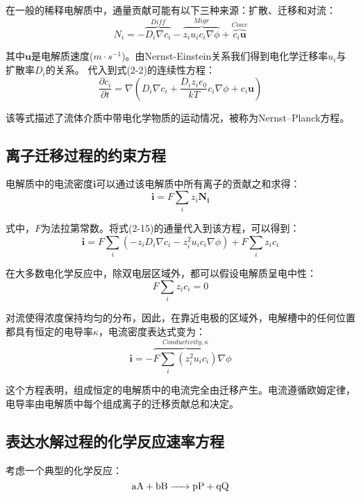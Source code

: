 在一般的稀释电解质中，通量贡献可能有以下三种来源：扩散、迁移和对流：
\begin{equation}
    N_i=-\overbrace{D_i\nabla{c_i}}^{Diff}-\overbrace{z_iu_ic_i\nabla\phi}^{Migr}+\overbrace{c_i\mathbf{u}}^{Conv}
\end{equation}

其中$\mathbf{u}$是电解质速度($m\cdot{s^{-1}}$)。由Nernst-Einstein关系我们得到电化学迁移率$u_i$与扩散率$D_i$的关系。
代入到式(2-2)的连续性方程：
\begin{equation}
    \frac{\partial c_i}{\partial t}=\nabla{(D_i\nabla{c_i}+\frac{D_iz_ie_0}{kT}c_i\nabla\phi+c_i\mathbf{u})}
    \label{equation:Nernst_Planck}
\end{equation}

该等式描述了流体介质中带电化学物质的运动情况，被称为Nernst–Planck方程\cite{Mehrer2007}。
\subsection{离子迁移过程的约束方程}
电解质中的电流密度$\mathbf{i}$可以通过该电解质中所有离子的贡献之和求得：
\begin{equation}
    \mathbf{i}=F\sum_i{z_i\mathbf{N_i}}
\end{equation}

式中，$F$为法拉第常数。将式(2-15)的通量代入到该方程，可以得到：
\begin{equation}
    \mathbf{i}=F\sum_i(-z_iD_i\nabla{c_i}-z_i^2u_ic_i\nabla\phi)+F\sum_iz_ic_i
\end{equation}

在大多数电化学反应中，除双电层区域外，都可以假设电解质呈电中性：
\begin{equation}
    F\sum_iz_ic_i=0
    \label{equation:neutrality}
\end{equation}

对流使得浓度保持均匀的分布，因此，在靠近电极的区域外，电解槽中的任何位置都具有恒定的电导率$\kappa$，电流密度表达式变为：
\begin{equation}
    \mathbf{i}=-\overbrace{F\sum_i(z_i^2u_ic_i)}^{Conductivity,\kappa}\nabla\phi
\end{equation}

这个方程表明，组成恒定的电解质中的电流完全由迁移产生。电流遵循欧姆定律，电导率由电解质中每个组成离子的迁移贡献总和决定\cite{Smedley1980}。

\subsection{表达水解过程的化学反应速率方程}
考虑一个典型的化学反应：
\begin{equation}
    \ce{aA + bB -> pP + qQ}
\end{equation}

